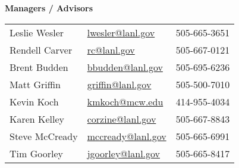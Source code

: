 
\begin{minipage}{0.45\textwidth} 
\begin{center}
{\normalsize \textbf{Managers / Advisors}}
\end{center}
\begin{tabular}{lll|}
	Leslie Wesler &   \href{mailto:lwesler@lanl.gov}{lwesler@lanl.gov} & 505-665-3651 \\
	Rendell Carver &   \href{mailto:rc@lanl.gov}{rc@lanl.gov} & 505-667-0121 \\
	Brent Budden & \href{mailto:bbudden@lanl.gov}{bbudden@lanl.gov} & 505-695-6236 \\
	Matt Griffin &  \href{mailto:griffin@lanl.gov}{griffin@lanl.gov} & 505-500-7010 \\
	Kevin Koch & \href{mailto:kmkoch@mcw.edu}{kmkoch@mcw.edu} & 414-955-4034 \\
	Karen Kelley &  \href{mailto:corzine@lanl.gov}{corzine@lanl.gov} & 505-667-8843 \\
	Steve McCready & \href{mailto:mccready@lanl.gov}{mccready@lanl.gov} & 505-665-6991 \\
	Tim Goorley & \href{mailto:jgoorley@lanl.gov}{jgoorley@lanl.gov} & 505-665-8417 \\
\end{tabular}
\end{minipage}%
\hspace{2mm}
